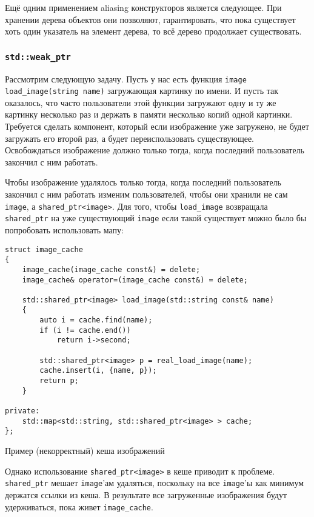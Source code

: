 Ещё одним применением aliasing конструкторов является следующее. При хранении дерева объектов они позволяют, гарантировать, что пока существует хоть один указатель на элемент дерева, то всё дерево продолжает существовать.

\subsubsection{\texttt{std::weak_ptr}}
\label{weak_ptr}

Рассмотрим следующую задачу. Пусть у нас есть функция \texttt{image load_image(string name)} загружающая картинку по имени. И пусть так оказалось, что часто пользователи этой функции загружают одну и ту же картинку несколько раз и держать в памяти несколько копий одной картинки. Требуется сделать компонент, который если изображение уже загружено, не будет загружать его второй раз, а будет переиспользовать существующее. Освобождаться изображение должно только тогда, когда последний пользователь закончил с ним работать.

Чтобы изображение удалялось только тогда, когда последний пользователь закончил с ним работать изменим пользователей, чтобы они хранили не сам \texttt{image}, а \texttt{shared_ptr<image>}. Для того, чтобы \texttt{load_image} возвращала \texttt{shared_ptr} на уже существующий \texttt{image} если такой существует можно было бы попробовать использовать мапу:

\begin{listing}
\begin{verbatim}
struct image_cache
{
    image_cache(image_cache const&) = delete;
    image_cache& operator=(image_cache const&) = delete;

    std::shared_ptr<image> load_image(std::string const& name)
    {
        auto i = cache.find(name);
        if (i != cache.end())
            return i->second;

        std::shared_ptr<image> p = real_load_image(name);
        cache.insert(i, {name, p});
        return p;
    }

private:
    std::map<std::string, std::shared_ptr<image> > cache;
};
\end{verbatim}
\caption{Пример (некорректный) кеша изображений}
\label{listing:shared_ptr_image_cache_broken}
\end{listing}

Однако использование \texttt{shared_ptr<image>} в кеше приводит к проблеме. \texttt{shared_ptr} мешает \texttt{image}'ам удаляться, поскольку на все \texttt{image}'ы как минимум держатся ссылки из кеша. В результате все загруженные изображения будут удерживаться, пока живет \texttt{image_cache}.

